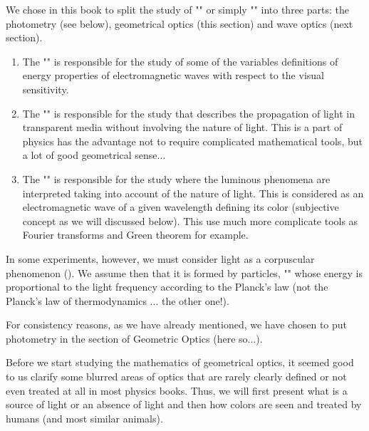 	We chose in this book to split the study of "" or simply "" into three parts: the photometry (see below), geometrical optics (this section) and wave optics (next section).
	\begin{enumerate}
		\item The "" is responsible for the study of some of the variables definitions of energy properties of electromagnetic waves with respect to the visual sensitivity.
		
		\item The "" is responsible for the study that describes the propagation of light in transparent media without involving the nature of light. This is a part of physics has the advantage not to require complicated mathematical tools, but a lot of good geometrical sense...
		
		\item The "" is responsible for the study where the luminous phenomena are interpreted taking into account of the nature of light. This is considered as an electromagnetic wave of a given wavelength defining its color (subjective concept as we will discussed below). This use much more complicate tools as Fourier transforms and Green theorem for example.
	\end{enumerate}
	In some experiments, however, we must consider light as a corpuscular phenomenon (). We assume then that it is formed by particles, "" whose energy is proportional to the light frequency according to the Planck's law (not the Planck's law of thermodynamics ... the other one!).
	
	For consistency reasons, as we have already mentioned, we have chosen to put photometry in the section of Geometric Optics (here so...).
	
	Before we start studying the mathematics of geometrical optics, it seemed good to us clarify some blurred areas of optics that are rarely clearly defined or not even treated at all in most physics books. Thus, we will first present what is a source of light or an absence of light and then how colors are seen and treated by humans (and most similar animals).
	
